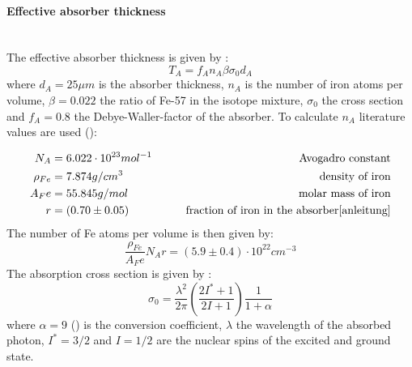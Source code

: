 \paragraph{Effective absorber thickness} \ \\
The effective absorber thickness is given by \cite{anleitung}:
\begin{equation}
T_A = f_An_A\beta\sigma_0d_A
\end{equation}
where $d_A = 25\mu m$ is the absorber thickness, $n_A$ is the number of iron atoms per volume, $\beta=0.022$ the ratio of Fe-57 in the isotope mixture, $\sigma_0$ the cross section and $f_A=0.8$ the Debye-Waller-factor of the absorber.
To calculate $n_A$ literature values are used (\cite{webelements}):

\begin{equation*}
\begin{aligned}
N_A &= 6.022 \cdot 10^{23} mol^{-1} \qquad& \text{Avogadro constant}\\
\rho_{Fe} &= 7.874 g/cm^3 \qquad& \text{density of iron} \\
A_Fe &= 55.845 g/mol \qquad& \text{molar mass of iron}\\
r &=  (0.70\pm0.05) \qquad& \text{fraction of iron in the absorber\cite{anleitung}}
\end{aligned}
\end{equation*}
The number of Fe atoms per volume is then given by:
\begin{equation*}
\frac{\rho_{Fe}}{A_Fe}N_Ar= (5.9\pm0.4)\cdot 10^{22} cm^{-3}
\end{equation*}
The absorption cross section is given by \cite{Wegener}:
\begin{equation}
\sigma_0= \frac{\lambda^2}{2\pi} \left(\frac{2I^*+1}{2I+1}\right) \frac{1}{1+\alpha}
\end{equation}
where $\alpha =9$ (\cite{Wegener}) is the conversion coefficient, $\lambda$ the wavelength of the absorbed photon, $I^*=3/2$ and $I=1/2$  are the nuclear spins of the excited and ground state.


